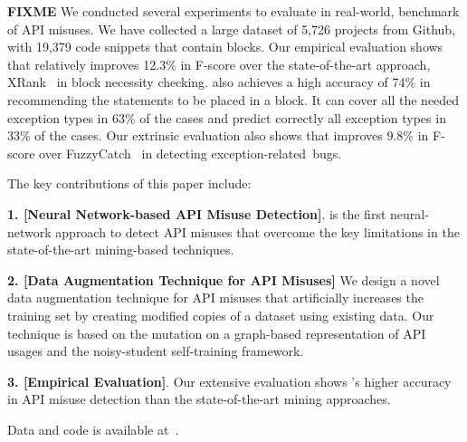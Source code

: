 {\bf FIXME} We conducted several experiments to evaluate {\tool} in
real-world, benchmark of API misuses. We have collected a large
dataset of 5,726 projects from Github, with 19,379 code snippets that
contain  blocks.
%
Our empirical evaluation shows that {\tool} relatively
improves 12.3\% in F-score over the state-of-the-art approach,
XRank~\cite{xrank-fse20} in  block necessity checking.
{\tool} also achieves a high accuracy of 74\% in recommending the
statements to be placed in a  block. It can cover all
the needed exception types in 63\% of the cases and predict correctly
all exception types in 33\% of the cases. Our extrinsic evaluation
also shows that {\tool} improves 9.8\% in F-score over
FuzzyCatch~\cite{xrank-fse20} in detecting exception-related~bugs.

The key contributions of this paper include:

\vspace{2pt}
{\bf 1. [Neural Network-based API Misuse
    Detection]}. {\tool} is the first neural-network approach to
detect API misuses that overcome the key limitations in the
state-of-the-art mining-based techniques.

\vspace{2pt}
{\bf 2. [Data Augmentation Technique for API Misuses]} We
design a novel data augmentation technique for API misuses that
artificially increases the training set by creating modified copies of
a dataset using existing data. Our technique is based on the mutation
on a graph-based representation of API usages and the noisy-student
self-training framework.

\vspace{2pt}
{\bf 3. [Empirical Evaluation]}. Our extensive evaluation
shows {\tool}'s higher accuracy in API misuse detection than the
state-of-the-art mining approaches.

Data and code is available at~\cite{muinspect-website}.

